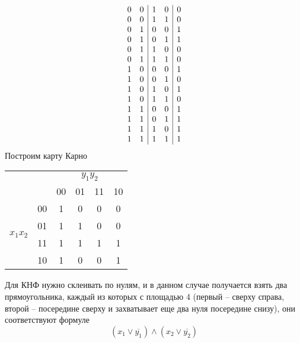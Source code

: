\begin{enumerate}
\begin{solution}
\begin{displaymath}
\begin{array}{c c|c c|c}
        0 & 0 & 1 & 0 & 0\\
        0 & 0 & 1 & 1 & 0\\
        0 & 1 & 0 & 0 & 1\\
        0 & 1 & 0 & 1 & 1\\
        0 & 1 & 1 & 0 & 0\\
        0 & 1 & 1 & 1 & 0\\
        1 & 0 & 0 & 0 & 1\\
        1 & 0 & 0 & 1 & 0\\
        1 & 0 & 1 & 0 & 1\\
        1 & 0 & 1 & 1 & 0\\
        1 & 1 & 0 & 0 & 1\\
        1 & 1 & 0 & 1 & 1\\
        1 & 1 & 1 & 0 & 1\\
        1 & 1 & 1 & 1 & 1\\
      \end{array}
    \end{displaymath}
    \newpage
    Построим карту Карно
    
    \begin{table}[ht!]
      \begin{tabular}{cc|cccc|}
      \cline{3-6}
                                                  &    & \multicolumn{4}{c|}{$y_1y_2$}                                                        \\ \cline{3-6} 
                                                  &    & \multicolumn{1}{c|}{00} & \multicolumn{1}{c|}{01} & \multicolumn{1}{c|}{11} & 10 \\ \hline
      \multicolumn{1}{|c|}{\multirow{4}{*}{$x_1x_2$}} & 00 & \multicolumn{1}{c|}{1}  & \multicolumn{1}{c|}{0}  & \multicolumn{1}{c|}{0}  & 0  \\ \cline{2-6} 
      \multicolumn{1}{|c|}{}                      & 01 & \multicolumn{1}{c|}{1}  & \multicolumn{1}{c|}{1}  & \multicolumn{1}{c|}{0}  & 0  \\ \cline{2-6} 
      \multicolumn{1}{|c|}{}                      & 11 & \multicolumn{1}{c|}{1}  & \multicolumn{1}{c|}{1}  & \multicolumn{1}{c|}{1}  & 1  \\ \cline{2-6} 
      \multicolumn{1}{|c|}{}                      & 10 & \multicolumn{1}{c|}{1}  & \multicolumn{1}{c|}{0}  & \multicolumn{1}{c|}{0}  & 1  \\ \hline
      \end{tabular}
    \end{table}

    Для КНФ нужно склеивать по нулям, и в данном случае получается взять два прямоугольника, каждый из которых с площадью 4 (первый -- сверху справа, второй -- посередине сверху и захватывает еще два нуля посередине снизу), они соответствуют формуле
    \begin{equation}
      (x_1 \lor \overline{y_1}) \land (x_2 \lor \overline{y_2})
    \end{equation}
  \end{solution}
  
\end{enumerate}

\clearpage
